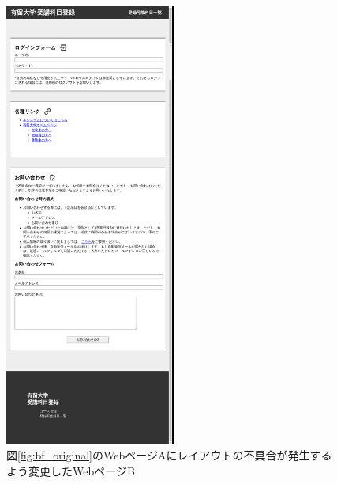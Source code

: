 \begin{figure}[htbp]
    \centering
    \includegraphics[width=0.5\textwidth]{image/5/original_png/af_original.png}
    \caption{図\ref{fig:bf_original}のWebページAにレイアウトの不具合が発生するよう変更したWebページB}
    \label{fig:af_original}
\end{figure}

